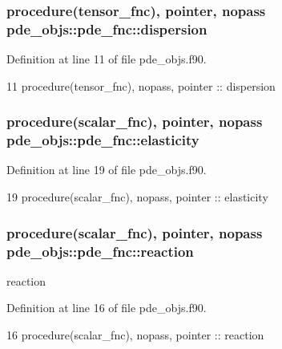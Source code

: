 \subsubsection[{dispersion}]{\setlength{\rightskip}{0pt plus 5cm}procedure({\bf tensor\+\_\+fnc}), pointer, nopass pde\+\_\+objs\+::pde\+\_\+fnc\+::dispersion}\label{structpde__objs_1_1pde__fnc_afa6e70d6216fe907cc382319f2f351c4}


Definition at line 11 of file pde\+\_\+objs.\+f90.


\begin{DoxyCode}
11     \textcolor{keywordtype}{procedure}(tensor_fnc), \textcolor{keywordtype}{nopass}, \textcolor{keywordtype}{pointer}           :: dispersion
\end{DoxyCode}
\subsubsection[{elasticity}]{\setlength{\rightskip}{0pt plus 5cm}procedure({\bf scalar\+\_\+fnc}), pointer, nopass pde\+\_\+objs\+::pde\+\_\+fnc\+::elasticity}\label{structpde__objs_1_1pde__fnc_ae28707cf062086a59751831b1429d8ad}


Definition at line 19 of file pde\+\_\+objs.\+f90.


\begin{DoxyCode}
19     \textcolor{keywordtype}{procedure}(scalar_fnc), \textcolor{keywordtype}{nopass}, \textcolor{keywordtype}{pointer}           :: elasticity
\end{DoxyCode}
\subsubsection[{reaction}]{\setlength{\rightskip}{0pt plus 5cm}procedure({\bf scalar\+\_\+fnc}), pointer, nopass pde\+\_\+objs\+::pde\+\_\+fnc\+::reaction}\label{structpde__objs_1_1pde__fnc_a7c81a7735c131fb6da61398c982912cc}


reaction 



Definition at line 16 of file pde\+\_\+objs.\+f90.


\begin{DoxyCode}
16     \textcolor{keywordtype}{procedure}(scalar_fnc), \textcolor{keywordtype}{nopass}, \textcolor{keywordtype}{pointer}           :: reaction
\end{DoxyCode}
